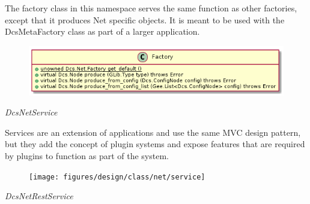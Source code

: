       \vspace*{-0.75cm}
      \begin{minipage}[t]{0.5\textwidth}
        \vspace*{0.5cm}
        The factory class in this namespace serves the same function as other
        factories, except that it produces Net specific objects. It is meant to
        be used with the DcsMetaFactory class as part of a larger application.
      \end{minipage} \hfill
      \begin{minipage}[t]{0.45\textwidth}
        \begin{figure}[H]
          \includegraphics[width=\textwidth]{figures/design/class/net/factory}
          \label{fig:dsg-classes-net-factory}
        \end{figure}
      \end{minipage}

      \emph{DcsNetService}

      \vspace*{-0.75cm}
      \begin{minipage}[t]{0.5\textwidth}
        \vspace*{0.5cm}
        Services are an extension of applications and use the same MVC design
        pattern, but they add the concept of plugin systems and expose features
        that are required by plugins to function as part of the system.
      \end{minipage} \hfill
      \begin{minipage}[t]{0.45\textwidth}
        \begin{figure}[H]
          \texttt{[image: figures/design/class/net/service]}
          \label{fig:dsg-classes-net-service}
        \end{figure}
      \end{minipage}

      \emph{DcsNetRestService}

